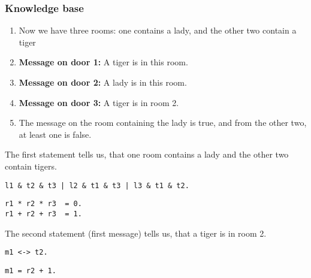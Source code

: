 \subsubsection{Knowledge base}

\begin{enumerate}

\item Now we have three rooms: one contains a lady, and the other two contain a tiger 

\item \textbf{Message on door 1:} A tiger is in this room.

\item \textbf{Message on door 2:} A lady is in this room.

\item \textbf{Message on door 3:} A tiger is in room 2.


\item The message on the room containing the lady is true, and from the other two, at least one is false.

\end{enumerate}


The first statement tells us, that one room contains a lady and the other two contain tigers.


\begin{multicols}{2}
\begin{lstlisting}[numbers=none,title=Propositional logic]
l1 & t2 & t3 | l2 & t1 & t3 | l3 & t1 & t2.

\end{lstlisting}

\begin{lstlisting}[numbers=none,title=Modular arithmetics]
r1 * r2 * r3  = 0.
r1 + r2 + r3  = 1.
\end{lstlisting}
\end{multicols}

The second statement (first message) tells us, that a tiger is in room 2.

\begin{multicols}{2}

\begin{lstlisting}[numbers=none,title=Propositional logic]
m1 <-> t2.
\end{lstlisting}

\begin{lstlisting}[numbers=none,title=Modular arithmetic]
m1 = r2 + 1.
\end{lstlisting}

\end{multicols}


